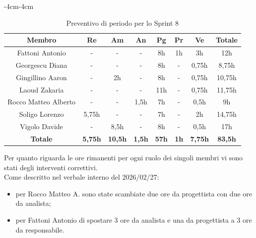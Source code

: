 \documentclass[a4paper,12pt]{article}
\begin{document}
\begin{table}[H]
    \begin{adjustwidth}{-4cm}{-4cm}
    \centering
    \begin{tabular}{|c|c|c|c|c|c|c|c|}
        \hline
        \textbf{Membro} & \textbf{Re} & \textbf{Am} & \textbf{An} & \textbf{Pg} & \textbf{Pr} & \textbf{Ve} & \textbf{Totale} \\
        \hline
        Fattoni Antonio & - & - & - & 8h & 1h & 3h & 12h \\
        \hline
        Georgescu Diana & - & - & - & 8h & - & 0,75h & 8,75h \\
        \hline
        Gingillino Aaron & - & 2h & - & 8h & - & 0,75h & 10,75h \\
        \hline
        Laoud Zakaria & - & - & - & 11h & - & 0,75h & 11,75h \\
        \hline
        Rocco Matteo Alberto & - & - & 1,5h & 7h & - & 0,5h & 9h \\
        \hline
        Soligo Lorenzo & 5,75h & - & - & 7h & - & 2h & 14,75h \\
        \hline
        Vigolo Davide & - & 8,5h & - & 8h & - & 0,5h & 17h \\
        \hline
          \textbf{Totale} & \textbf{5,75h} & \textbf{10,5h} & \textbf{1,5h} & \textbf{57h} & \textbf{1h} & \textbf{7,75h} & \textbf{83,5h} \\
        \hline
    \end{tabular}
    \caption{Preventivo di periodo per lo Sprint 8}
    \end{adjustwidth}
\end{table}

Per quanto riguarda le ore rimanenti per ogni ruolo dei singoli membri vi sono stati degli interventi correttivi.\\
Come descritto nel verbale interno del 2026/02/27:
\begin{itemize}
    \item per Rocco Matteo A. sono state scambiate due ore da progettista con due ore da analista;
    \item  per Fattoni Antonio di spostare 3 ore da analista e una da progettista a 3 ore da responsabile.
\end{itemize}
\end{document}

